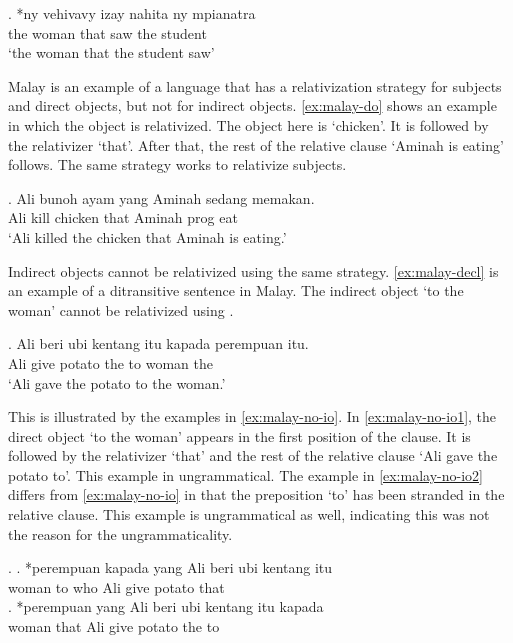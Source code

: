 \exg. *ny vehivavy izay nahita ny mpianatra\\
 the woman that saw the student\\
 `the woman that the student saw' \label{ex:malagasy-no-do}

Malay is an example of a language that has a relativization strategy for subjects and direct objects, but not for indirect objects. \ref{ex:malay-do} shows an example in which the object is relativized. The object here is  `chicken'. It is followed by the relativizer  `that'. After that, the rest of the relative clause  `Aminah is eating' follows. The same strategy works to relativize subjects.

\exg. Ali bunoh ayam yang Aminah sedang memakan.\\
 Ali kill chicken that Aminah \ac{prog} eat\\
 `Ali killed the chicken that Aminah is eating.' \label{ex:malay-do}

Indirect objects cannot be relativized using the same strategy. \ref{ex:malay-decl} is an example of a ditransitive sentence in Malay. The indirect object  `to the woman' cannot be relativized using .

\exg. Ali beri {ubi kentang} itu kapada perempuan itu.\\
 Ali give potato the to woman the\\
 `Ali gave the potato to the woman.'\label{ex:malay-decl} \label{ex:malay-no-io2}

This is illustrated by the examples in \ref{ex:malay-no-io}. In \ref{ex:malay-no-io1}, the direct object  `to the woman' appears in the first position of the clause. It is followed by the relativizer  `that' and the rest of the relative clause  `Ali gave the potato to'. This example in ungrammatical. The example in \ref{ex:malay-no-io2} differs from \ref{ex:malay-no-io} in that the preposition  `to' has been stranded in the relative clause. This example is ungrammatical as well, indicating this was not the reason for the ungrammaticality.

\ex.\label{ex:malay-no-io}
\ag. *perempuan kapada yang Ali beri {ubi kentang} itu\\
 woman to who Ali give potato that\\ \label{ex:malay-no-io1}
\bg. *perempuan yang Ali beri {ubi kentang} itu kapada\\
 woman that Ali give potato the to\\ \label{ex:malay-no-io2}

